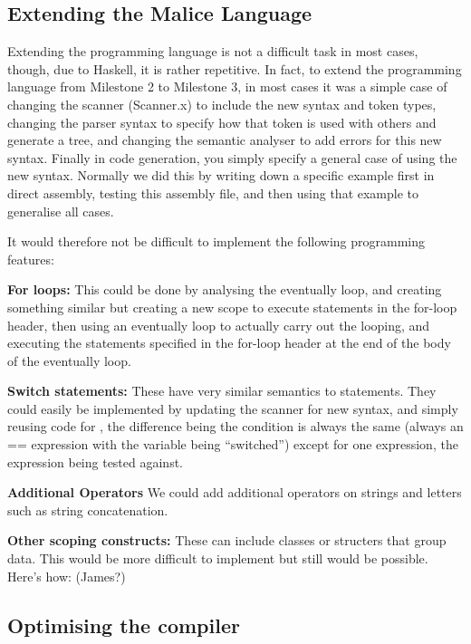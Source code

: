 \documentclass[a4wide, 10pt]{article}
\begin{document}
\subsection{Extending the Malice Language}

Extending the programming language is not a difficult task in most cases,
though, due to Haskell, it is rather repetitive. In fact, to extend the
programming language from Milestone 2 to Milestone 3, in most cases it was a
simple case of changing the scanner (Scanner.x) to include the new syntax and
token types, changing the parser syntax to specify how that token is used with
others and generate a tree, and changing the semantic analyser to add errors
for this new syntax. Finally in code generation, you simply specify a general
case of using the new syntax. Normally we did this by writing down a specific
example first in direct assembly, testing this assembly file, and then using
that example to generalise all cases.



It would therefore not be difficult to implement the following programming
features:

\textbf{For loops:} This could be done by analysing the eventually loop, and
creating something similar but creating a new scope to execute statements in
the for-loop header, then using an eventually loop to actually carry out the
looping, and executing the statements specified in the for-loop header at the
end of the body of the eventually loop.

\textbf{Switch statements:} These have very similar semantics to  
statements. They could easily be implemented by updating the scanner for new
syntax, and simply reusing code for  , the difference being the condition is
always the same (always an == expression with the variable being ``switched'')
except for one expression, the expression being tested against.

\textbf{Additional Operators} We could add additional operators on strings and
letters such as string concatenation. 

\textbf{Other scoping constructs:} These can include classes or structers
that group data. This would be more difficult to implement but still would be
possible. Here's how: (James?)



\subsection{Optimising the compiler}
\end{document}
